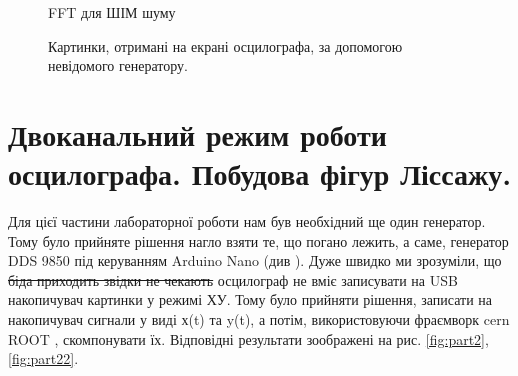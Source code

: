 \begin{figure}[h]
\begin{minipage}[h]{0.47\linewidth}
		 FFT для ШІМ шуму\\
	\end{minipage}
	\caption{Картинки, отримані на екрані осцилографа, за допомогою невідомого генератору.}
	\label{fig:part1}
\end{figure}

\section{Двоканальний режим роботи осцилографа. Побудова фігур Ліссажу.}

Для цієї частини лабораторної роботи нам був необхідний ще один генератор. Тому було прийняте рішення нагло взяти те, що погано лежить, а саме, генератор DDS 9850 під керуванням Arduino Nano (див \cite{lab3}). Дуже швидко ми зрозуміли, що \sout{біда приходить звідки не чекають} осцилограф не вміє записувати на USB накопичувач картинки у режимі ХУ. Тому було прийняти рішення, записати на накопичувач сигнали у виді х(t) та y(t), а потім, використовуючи фраємворк cern ROOT \cite{root}, скомпонувати їх. Відповідні результати зоображені на рис. \ref{fig:part2},\ref{fig:part22}.

